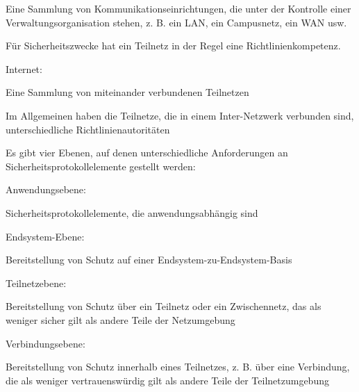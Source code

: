 \documentclass[a4paper]{article}
\begin{document}
\begin{multicols}{3}
\begin{itemize*}
            \begin{itemize*}
                  \item Eine Sammlung von Kommunikationseinrichtungen, die unter der Kontrolle einer Verwaltungsorganisation stehen, z. B. ein LAN, ein Campusnetz, ein WAN usw.
                  \item Für Sicherheitszwecke hat ein Teilnetz in der Regel eine Richtlinienkompetenz.
            \end{itemize*}
            \item
            Internet:

            \begin{itemize*}
                  \item Eine Sammlung von miteinander verbundenen Teilnetzen
                  \item Im Allgemeinen haben die Teilnetze, die in einem Inter-Netzwerk verbunden sind, unterschiedliche Richtlinienautoritäten
            \end{itemize*}
            \item
            Es gibt vier Ebenen, auf denen unterschiedliche Anforderungen an
            Sicherheitsprotokollelemente gestellt werden:

            \begin{itemize*}
                  \item Anwendungsebene:
                  \begin{itemize*} \item Sicherheitsprotokollelemente, die anwendungsabhängig sind \end{itemize*}
                  \item Endsystem-Ebene:
                  \begin{itemize*} \item Bereitstellung von Schutz auf einer Endsystem-zu-Endsystem-Basis \end{itemize*}
                  \item Teilnetzebene:
                  \begin{itemize*} \item Bereitstellung von Schutz über ein Teilnetz oder ein Zwischennetz, das als weniger sicher gilt als andere Teile der Netzumgebung \end{itemize*}
                  \item Verbindungsebene:
                  \begin{itemize*} \item Bereitstellung von Schutz innerhalb eines Teilnetzes, z. B. über eine Verbindung, die als weniger vertrauenswürdig gilt als andere Teile der Teilnetzumgebung \end{itemize*}
            \end{itemize*}
      \end{itemize*}



\end{multicols}
\end{document}
